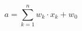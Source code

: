 \begin{equation}
    a = \sum_{k=1}^{n} w_k \cdot x_k + w_0
    \label{eq:weighted_sum}
\end{equation}